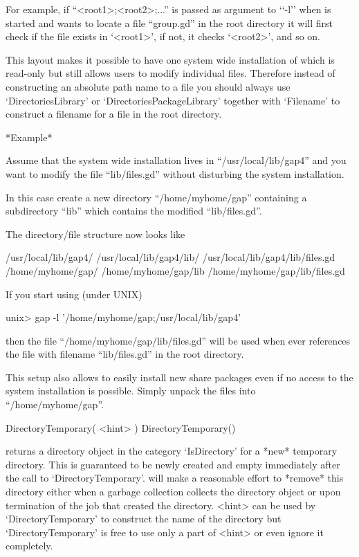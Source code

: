 For example,  if  ``<root1>;<root2>;...''    is  passed as   argument  to
`{`-l'}' when   {\GAP} is started   and  {\GAP} wants  to locate  a  file
``group.gd'' in the {\GAP} root directory it will first check if the file
exists in `<root1>', if not, it checks `<root2>', and so on.

This layout makes  it possible to  have one  system wide  installation of
{\GAP}  which is read-only  but still  allows users  to modify individual
files.  Therefore instead of constructing an absolute path name to a file
you should always use `DirectoriesLibrary' or `DirectoriesPackageLibrary'
together with `Filename' to construct a filename for a file in the {\GAP}
root directory.

*Example*

Assume that the system wide installation lives in ``/usr/local/lib/gap4''
and you want  to modify the  file ``lib/files.gd'' without disturbing the
system installation.

In  this case create  a  new directory ``/home/myhome/gap'' containing  a
subdirectory ``lib'' which contains the modified ``lib/files.gd''.

The directory/file structure now looks like

\begintt
    /usr/local/lib/gap4/
    /usr/local/lib/gap4/lib/
    /usr/local/lib/gap4/lib/files.gd
    /home/myhome/gap/
    /home/myhome/gap/lib
    /home/myhome/gap/lib/files.gd
\endtt


If you start {\GAP} using (under UNIX)

\begintt
    unix> gap -l '/home/myhome/gap;/usr/local/lib/gap4'
\endtt

then the  file ``/home/myhome/gap/lib/files.gd'' will   be used when ever
{\GAP} references the  file with filename  ``lib/files.gd'' in the {\GAP}
root directory.

This setup also allows  to easily install  new share packages even if  no
access to the system {\GAP} installation is  possible.  Simply unpack the
files into ``/home/myhome/gap''.


\>DirectoryTemporary( <hint> )
\)DirectoryTemporary()

returns  a directory  object in the   category `IsDirectory' for a  *new*
temporary directory.   This is guaranteed to  be  newly created and empty
immediately  after the call to `DirectoryTemporary'.   {\GAP} will make a
reasonable effort   to *remove* this   directory  either  when a  garbage
collection  collects the directory   object  or upon termination  of  the
{\GAP}   job that   created  the  directory.     <hint> can  be  used  by
`DirectoryTemporary' to construct    the  name  of the    directory   but
`DirectoryTemporary' is free to use only a  part of <hint> or even ignore
it completely.

